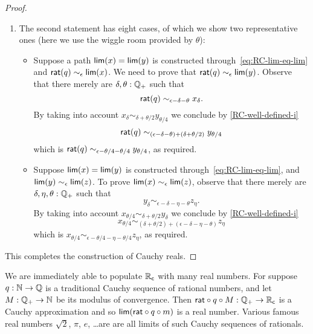 \begin{proof}
\begin{enumerate}
\begin{itemize}
    \end{itemize}
  \item The second statement has eight cases, of which we show two representative ones
    (here we use the wiggle room provided by $\theta$):
    \begin{itemize}
    \item Suppose a path $\mathsf{lim}(x) = \mathsf{lim}(y)$ is constructed
      through~\eqref{eq:RC-lim-eq-lim} and $\mathsf{rat}(q) \sim_\epsilon \mathsf{lim}(x)$. We need to
      prove that $\mathsf{rat}(q) \sim_\epsilon \mathsf{lim}(y)$. Observe that there merely are
      $\delta, \theta : \mathbb{Q}_{+}$ such that
      \begin{equation*}
        \mathsf{rat}(q) \sim_{\epsilon - \delta - \theta} x_\delta.
      \end{equation*}
      By taking into account $x_\delta \sim_{\delta + \theta/2} y_{\theta/4}$ we conclude
      by \autoref{RC-well-defined-i}
      \begin{equation*}
        \mathsf{rat}(q) \sim_{(\epsilon - \delta - \theta) + (\delta + \theta/2)} y_{\theta/4}
      \end{equation*}
      which is $\mathsf{rat}(q) \sim_{\epsilon - \theta/4 - \theta/4} y_{\theta/4}$, as required.
    \item Suppose $\mathsf{lim}(x) = \mathsf{lim}(y)$ is constructed through~\eqref{eq:RC-lim-eq-lim},
      and $\mathsf{lim}(y) \sim_\epsilon \mathsf{lim}(z)$. To prove $\mathsf{lim}(x) \sim_\epsilon
      \mathsf{lim}(z)$, observe that there merely are $\delta, \eta, \theta : \mathbb{Q}_{+}$ such that
      \begin{equation*}
        y_\delta \sim_{\epsilon - \delta - \eta - \theta} z_\eta.
      \end{equation*}
      By taking into account $x_{\theta/4} \sim_{\delta + \theta/2} y_\delta$ we conclude
      by \autoref{RC-well-defined-i}
      \begin{equation*}
        x_{\theta/4} \sim_{(\delta + \theta/2) + (\epsilon - \delta - \eta - \theta)} z_\eta
      \end{equation*}
      which is $x_{\theta/4} \sim_{\epsilon - \theta/4 - \eta - \theta/4} z_\eta$, as
      required.
    \end{itemize}
  \end{enumerate}
  This completes the construction of Cauchy reals.
\end{proof}

We are immediately able to populate $\mathbb{R}_\mathsf{c}$ with many real numbers. For suppose $q : \mathbb{N} \to
\mathbb{Q}$ is a traditional Cauchy sequence of rational numbers, and let $M : \mathbb{Q}_{+} \to \mathbb{N}$ be its
modulus of convergence. Then $\mathsf{rat} \circ q \circ M : \mathbb{Q}_{+} \to \mathbb{R}_\mathsf{c}$ is a Cauchy
approximation and so $\mathsf{lim}(\mathsf{rat} \circ q \circ m)$ is a real number. Various famous
real numbers $\sqrt{2}$, $\pi$, $e$, \dots are are all limits of such Cauchy sequences of
rationals.

